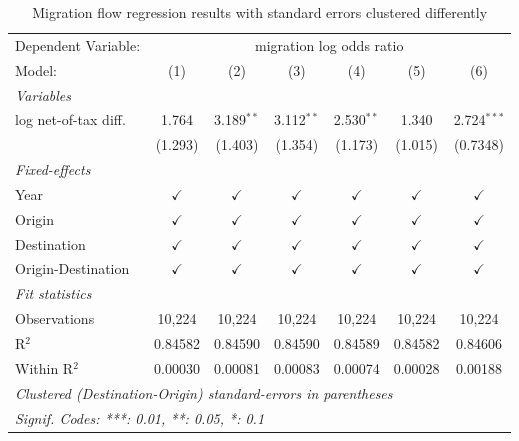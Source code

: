 \documentclass[11pt]{article}
\begin{document}
\begin{table}[htbp]
	\centering
	\small
	\begin{threeparttable}[b]
		\begin{tabular}{lcccccc}
			\toprule
			Dependent Variable: & \multicolumn{6}{c}{migration log odds ratio}\\
			Model:             & (1)           & (2)           & (3)           & (4)           & (5)           & (6)\\  
			\midrule
			\emph{Variables}\\
			log net-of-tax diff.    & 1.764         & 3.189$^{**}$  & 3.112$^{**}$  & 2.530$^{**}$  & 1.340         & 2.724$^{***}$\\   
			& (1.293)       & (1.403)       & (1.354)       & (1.173)       & (1.015)       & (0.7348)\\   
			\midrule
			\emph{Fixed-effects}\\
			Year               & $\checkmark$  & $\checkmark$  & $\checkmark$  & $\checkmark$  & $\checkmark$  & $\checkmark$\\   
			Origin             & $\checkmark$  & $\checkmark$  & $\checkmark$  & $\checkmark$  & $\checkmark$  & $\checkmark$\\   
			Destination        & $\checkmark$  & $\checkmark$  & $\checkmark$  & $\checkmark$  & $\checkmark$  & $\checkmark$\\   
			Origin-Destination & $\checkmark$  & $\checkmark$  & $\checkmark$  & $\checkmark$  & $\checkmark$  & $\checkmark$\\   
			\midrule
			\emph{Fit statistics}\\
			Observations       & 10,224        & 10,224        & 10,224        & 10,224        & 10,224        & 10,224\\  
			R$^2$              & 0.84582       & 0.84590       & 0.84590       & 0.84589       & 0.84582       & 0.84606\\  
			Within R$^2$       & 0.00030       & 0.00081       & 0.00083       & 0.00074       & 0.00028       & 0.00188\\  
			\midrule
			\multicolumn{7}{l}{\emph{Clustered (Destination-Origin) standard-errors in parentheses}}\\
			\multicolumn{7}{l}{\emph{Signif. Codes: ***: 0.01, **: 0.05, *: 0.1}}\\
		\end{tabular}
	\end{threeparttable}
	\caption{Migration flow regression results with standard errors clustered differently}
	\label{table:migflow_1way}
\end{table}
\end{document}
